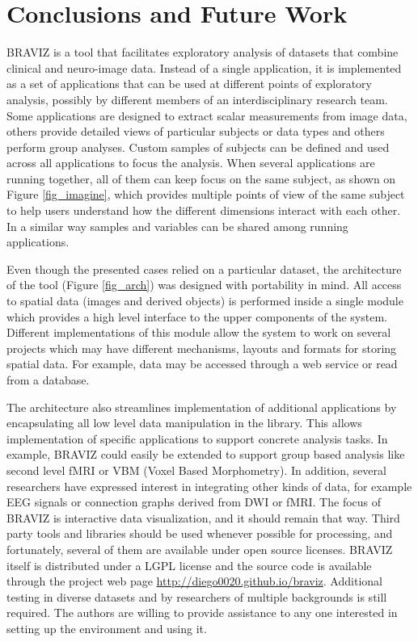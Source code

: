\documentclass{frontiersHLTH}
\begin{document}
\section{Conclusions and Future Work}

BRAVIZ is a tool that facilitates exploratory analysis of datasets that combine clinical and neuro-image data. Instead of a single application, it is implemented as a set of applications that can be used at different points of exploratory analysis, possibly by different members of an interdisciplinary research team. Some applications are designed to extract scalar measurements from image data, others provide detailed views of particular subjects or data types and others perform group analyses. Custom samples of subjects can be defined and used across all applications to focus the analysis. When several applications are running together, all of them can keep focus on the same subject, as shown on Figure \ref{fig_imagine}, which provides multiple points of view of the same subject to help users understand how the different dimensions interact with each other. In a similar way samples and variables can be shared among running applications.

Even though the presented cases relied on a particular dataset, the architecture of the tool (Figure \ref{fig_arch}) was designed with portability in mind. All access to spatial data (images and derived objects) is performed inside a single module which provides a high level interface to the upper components of the system. Different implementations of this module  allow the system to work on several projects which may have different mechanisms, layouts and formats for storing spatial data. For example, data may be accessed through a web service or read from a database. 

The architecture  also streamlines implementation of additional applications by encapsulating all low level data manipulation in the library. This allows implementation of specific applications to support concrete analysis tasks. In example, BRAVIZ could easily be extended to support group based analysis like second level fMRI or VBM (Voxel Based Morphometry). In addition, several researchers have expressed  interest in integrating other kinds of data, for example EEG signals or connection graphs \cite{rubinov_complex_2010} derived from DWI or fMRI.  
The focus of BRAVIZ is interactive data visualization, and it should remain that way. Third party tools and libraries should be used whenever possible for processing, and fortunately, several of them are available under open source licenses. BRAVIZ itself is distributed under a LGPL license and the source code is available through the project web page \url{http://diego0020.github.io/braviz}. Additional testing in diverse datasets and by researchers of multiple backgrounds is still required. The authors are willing to provide assistance to any one interested in setting up the environment and using it. 
\end{document}
